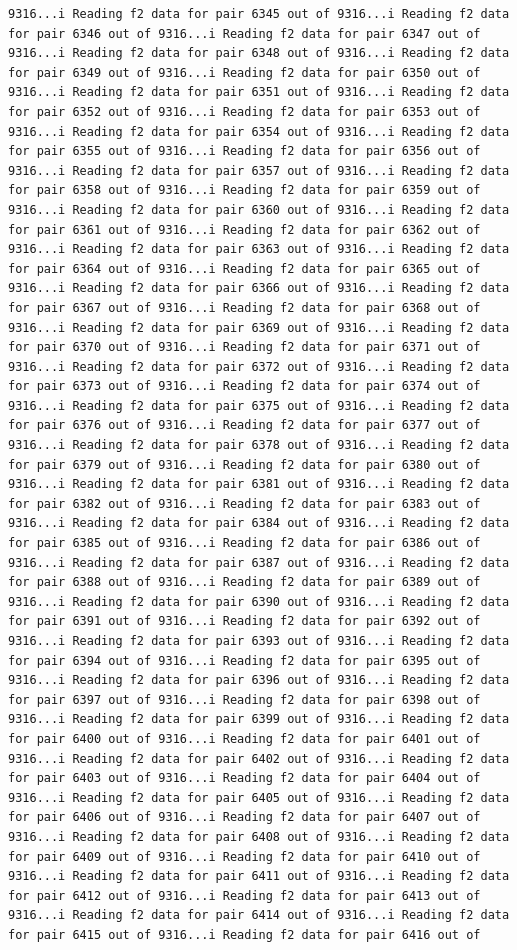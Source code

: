 \documentclass[
]{article}
\begin{document}
\begin{verbatim}
9316...i Reading f2 data for pair 6345 out of 9316...i Reading f2 data for pair 6346 out of 9316...i Reading f2 data for pair 6347 out of 9316...i Reading f2 data for pair 6348 out of 9316...i Reading f2 data for pair 6349 out of 9316...i Reading f2 data for pair 6350 out of 9316...i Reading f2 data for pair 6351 out of 9316...i Reading f2 data for pair 6352 out of 9316...i Reading f2 data for pair 6353 out of 9316...i Reading f2 data for pair 6354 out of 9316...i Reading f2 data for pair 6355 out of 9316...i Reading f2 data for pair 6356 out of 9316...i Reading f2 data for pair 6357 out of 9316...i Reading f2 data for pair 6358 out of 9316...i Reading f2 data for pair 6359 out of 9316...i Reading f2 data for pair 6360 out of 9316...i Reading f2 data for pair 6361 out of 9316...i Reading f2 data for pair 6362 out of 9316...i Reading f2 data for pair 6363 out of 9316...i Reading f2 data for pair 6364 out of 9316...i Reading f2 data for pair 6365 out of 9316...i Reading f2 data for pair 6366 out of 9316...i Reading f2 data for pair 6367 out of 9316...i Reading f2 data for pair 6368 out of 9316...i Reading f2 data for pair 6369 out of 9316...i Reading f2 data for pair 6370 out of 9316...i Reading f2 data for pair 6371 out of 9316...i Reading f2 data for pair 6372 out of 9316...i Reading f2 data for pair 6373 out of 9316...i Reading f2 data for pair 6374 out of 9316...i Reading f2 data for pair 6375 out of 9316...i Reading f2 data for pair 6376 out of 9316...i Reading f2 data for pair 6377 out of 9316...i Reading f2 data for pair 6378 out of 9316...i Reading f2 data for pair 6379 out of 9316...i Reading f2 data for pair 6380 out of 9316...i Reading f2 data for pair 6381 out of 9316...i Reading f2 data for pair 6382 out of 9316...i Reading f2 data for pair 6383 out of 9316...i Reading f2 data for pair 6384 out of 9316...i Reading f2 data for pair 6385 out of 9316...i Reading f2 data for pair 6386 out of 9316...i Reading f2 data for pair 6387 out of 9316...i Reading f2 data for pair 6388 out of 9316...i Reading f2 data for pair 6389 out of 9316...i Reading f2 data for pair 6390 out of 9316...i Reading f2 data for pair 6391 out of 9316...i Reading f2 data for pair 6392 out of 9316...i Reading f2 data for pair 6393 out of 9316...i Reading f2 data for pair 6394 out of 9316...i Reading f2 data for pair 6395 out of 9316...i Reading f2 data for pair 6396 out of 9316...i Reading f2 data for pair 6397 out of 9316...i Reading f2 data for pair 6398 out of 9316...i Reading f2 data for pair 6399 out of 9316...i Reading f2 data for pair 6400 out of 9316...i Reading f2 data for pair 6401 out of 9316...i Reading f2 data for pair 6402 out of 9316...i Reading f2 data for pair 6403 out of 9316...i Reading f2 data for pair 6404 out of 9316...i Reading f2 data for pair 6405 out of 9316...i Reading f2 data for pair 6406 out of 9316...i Reading f2 data for pair 6407 out of 9316...i Reading f2 data for pair 6408 out of 9316...i Reading f2 data for pair 6409 out of 9316...i Reading f2 data for pair 6410 out of 9316...i Reading f2 data for pair 6411 out of 9316...i Reading f2 data for pair 6412 out of 9316...i Reading f2 data for pair 6413 out of 9316...i Reading f2 data for pair 6414 out of 9316...i Reading f2 data for pair 6415 out of 9316...i Reading f2 data for pair 6416 out of 
\end{verbatim}
\end{document}
